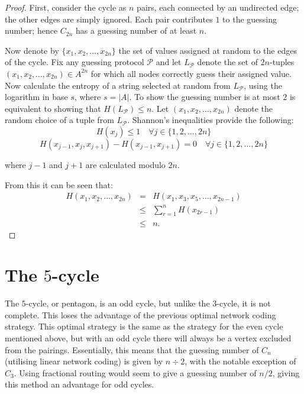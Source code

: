 \begin{proof}
First, consider the cycle as $n$ pairs, each connected by an undirected edge; the other edges are simply ignored. Each pair contributes $1$ to the guessing number; hence $C_{2n}$ has a guessing number of at least $n$.

Now denote by $\{ x_1, x_2, \dots, x_{2n} \}$ the set of values assigned at random to the edges of the cycle. Fix any guessing protocol $\mathcal{P}$ and let $L_\mathcal{P}$ denote the set of $2n$-tuples $(x_1, x_2, \dots, x_{2n} ) \in A^{2n}$ for which all nodes correctly guess their assigned value. Now calculate the entropy of a string selected at random from $L_\mathcal{P}$, using the logarithm in base $s$, where $s = |A|$. To show the guessing number is at most $2$ is equivalent to showing that $H(L_\mathcal{P}) \leq n$. Let $(x_1, x_2, \dots, x_{2n} )$ denote the random choice of a tuple from $L_\mathcal{P}$. Shannon's inequalities provide the following:
\[H(x_j) \leq 1 \quad \forall j \in \{1, 2, \dots, 2n\} \]
\[H(x_{j - 1}, x_j, x_{j + 1}) - H(x_{j - 1}, x_{j + 1}) = 0 \quad \forall j \in \{1, 2, \dots, 2n\} \]

where $j - 1$ and $j + 1$ are calculated modulo $2n$.

From this it can be seen that:
\begin{eqnarray*}
  	H(x_1, x_2, \dots, x_{2n}) & = & H(x_1, x_3, x_5, \dots, x_{2n - 1}) \\
  	                            & \leq & \sum_{r = 1}^n H(x_{2r - 1}) \\
                                & \leq & n.
\end{eqnarray*}
\end{proof}

\section{The $5$-cycle}
\label{pentagon}

The $5$-cycle, or pentagon, is an odd cycle, but unlike the $3$-cycle, it is not complete. This loses the advantage of the previous optimal network coding strategy. This optimal strategy is the same as the strategy for the even cycle mentioned above, but with an odd cycle there will always be a vertex excluded from the pairings. Essentially, this means that the guessing number of $C_n$ (utilising linear network coding) is given by $n \div 2$, with the notable exception of $C_3$. Using fractional routing would seem to give a guessing number of $n/2$, giving this method an advantage for odd cycles.

